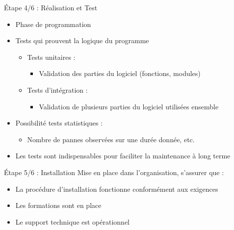 \documentclass[14pt]{beamer}
\begin{document}
\begin{framentitle}{Étape 4/6 : Réalisation et Test}
    \begin{itemize}
        \item Phase de programmation
        \item Tests qui prouvent la logique du programme
            \begin{itemize}
                \item Tests unitaires :
                    \begin{itemize}
                        \item Validation des parties du logiciel (fonctions,
                            modules)
                    \end{itemize}
                \item Tests d'intégration :
                    \begin{itemize}
                        \item Validation de plusieurs parties du logiciel
                            utilisées ensemble
                    \end{itemize}
            \end{itemize}
        \item Possibilité tests statistiques :
            \begin{itemize}
                \item Nombre de pannes observées sur une durée donnée, etc.
            \end{itemize}
        \item[\ra] Les tests sont indispensables pour faciliter la
            maintenance à long terme
    \end{itemize}
\end{framentitle}

\begin{framentitle}{Étape 5/6 : Installation}
    Mise en place dans l'organisation, s'assurer que :
    \begin{itemize}
        \item La procédure d'installation fonctionne conformément
            aux exigences
        \item Les formations sont en place
        \item Le support technique est opérationnel
    \end{itemize}
\end{framentitle}
\end{document}

